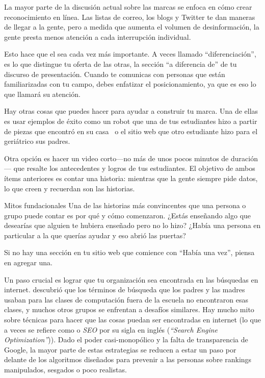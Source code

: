 La mayor parte de la discusión actual sobre las marcas se enfoca 
en cómo crear reconocimiento en línea.
Las listas de correo,
los blogs
y Twitter te dan maneras de llegar a la gente,
pero a medida que aumenta el volumen de desinformación,
la gente presta menos atención a cada interrupción individual.

Esto hace que el  sea cada vez más importante.
A veces llamado ``diferenciación'',
es lo que distingue tu oferta de las otras, la sección ``a diferencia de'' de tu discurso de presentación.
Cuando te comunicas con personas que están familiarizadas con tu campo,
debes enfatizar el posicionamiento,
ya que es eso lo que llamará su atención.

Hay otras cosas que puedes hacer para ayudar a construir tu marca.
Una de ellas es usar ejemplos de éxito como un robot que una de tus estudiantes 
hizo a partir de piezas que encontró en su casa~\cite{Schw2013}
o el sitio web que otro estudiante hizo para el geriátrico sus padres.

Otra opción es hacer un video corto---no más de unos pocos minutos de duración---
que resalte los antecedentes y logros de tus estudiantes.
El objetivo de ambos ítems anteriores es contar una historia:
mientras que la gente siempre pide datos,
lo que creen y recuerdan son las historias.

\begin{aside}{Mitos fundacionales}
Una de las historias más convincentes que una persona o grupo puede contar es
por qué y cómo comenzaron.
¿Estás enseñando algo que desearías que alguien te hubiera enseñado pero no lo hizo?
¿Había una persona en particular a la que querías ayudar
y eso abrió las puertas?

Si no hay una sección en tu sitio web que comience con ``Había una vez'',
piensa en agregar una.
\end{aside}

Un paso crucial es lograr que tu organización sea encontrada en las búsquedas en internet. 
\cite{DiSa2014b} descubrió que
los términos de búsqueda que los padres y las madres usaban para las clases de computación fuera de la escuela no encontraron esas clases, 
y muchos otros grupos se enfrentan a desafíos similares.
Hay mucho mito sobre técnicas para hacer que las cosas puedan ser encontradas en internet (lo que a veces se refiere como  o \emph{SEO} por su sigla en inglés (\emph{``Search Engine Optimization''})). 
Dado el poder casi-monopólico y la falta de transparencia de Google,
la mayor parte de estas estrategias se reducen a estar un paso por delante de los
algoritmos diseñados para prevenir a las personas sobre rankings manipulados, sesgados o poco realistas.


